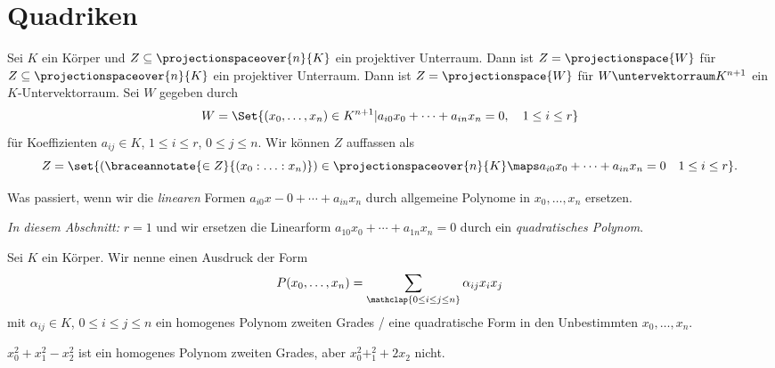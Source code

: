 \section{Quadriken}\label{projektive_quadriken}
Sei \( K \) ein Körper und \( Z\subseteq \projectionspaceover{n}{K} \) ein projektiver Unterraum. Dann ist \( Z=\projectionspace{W} \) für \(Z\subseteq \projectionspaceover{n}{K} \) ein projektiver Unterraum. Dann ist \( Z=\projectionspace{W} \) für \( W\untervektorraum K^{n+1} \) ein \( K \)-Untervektorraum. Sei \( W \) gegeben durch
\begin{equation*}
  W=\Set{(x_0,\dotsc,x_n)\in K^{n+1}|a_{i0}x_0+\dotsb+a_{in}x_n=0,\quad 1\leq i\leq r}
\end{equation*}
für Koeffizienten \( a_{ij}\in K  \), \( 1\leq i \leq r \), \( 0\leq j\leq n \). Wir können \( Z \) auffassen als
\begin{equation*}
  Z=\set{(\braceannotate{\in Z}{(x_0:\dotsc:x_n)})\in \projectionspaceover{n}{K}\maps a_{i0}x_0+\dotsb+a_{in}x_n=0\quad 1\leq i\leq r}.
\end{equation*}
\begin{frage*}
  Was passiert, wenn wir die \emph{linearen} Formen \( a_{i0}x-0+\dotsb+a_{in}x_n \) durch allgemeine Polynome in \( x_0,\dotsc,x_n \) ersetzen.
\end{frage*}
\emph{In diesem Abschnitt:} \( r=1 \) und wir ersetzen die Linearform \( a_{10}x_0+\dotsb+a_{1n}x_n=0 \) durch ein \emph{quadratisches Polynom}.
\begin{definition*}
  Sei \( K \) ein Körper. Wir nenne einen Ausdruck der Form
  \begin{equation*}
    P(x_0,\dotsc,x_n)=\sum_{\mathclap{0\leq i\leq j\leq n}}\alpha_{ij}x_i x_j
  \end{equation*}
  mit \( \alpha_{ij}\in K \), \( 0\leq i\leq j\leq n \) ein homogenes Polynom zweiten Grades / eine quadratische Form in den Unbestimmten \( x_0,\dotsc,x_n \).
\end{definition*}
\begin{beispiel*}
  \( x_0^2+x_1^2-x_2^2 \) ist ein homogenes Polynom zweiten Grades, aber \( x_0^2+_1^2+2x_2 \)  nicht.
\end{beispiel*}
